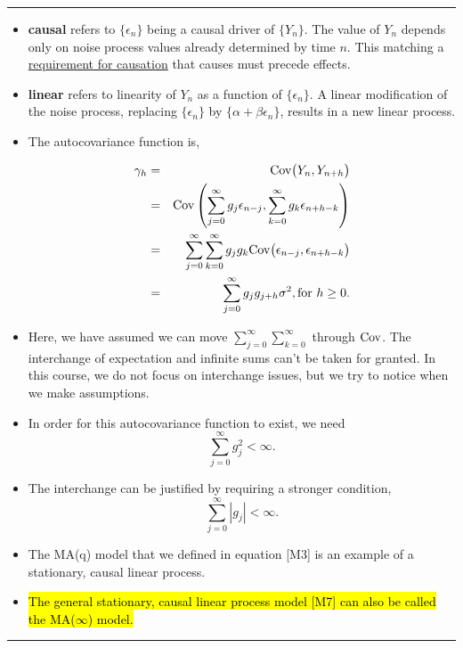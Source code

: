 \documentclass[]{article}
\begin{document}
\begin{center}\rule{0.5\linewidth}{\linethickness}\end{center}

\begin{itemize}
\item
  \textbf{causal} refers to \(\{\epsilon_n\}\) being a causal driver of
  \(\{Y_n\}\). The value of \(Y_n\) depends only on noise process values
  already determined by time \(n\). This matching a
  \href{https://en.wikipedia.org/wiki/Bradford_Hill_criteria}{requirement
  for causation} that causes must precede effects.
\item
  \textbf{linear} refers to linearity of \(Y_n\) as a function of
  \(\{\epsilon_n\}\). A linear modification of the noise process,
  replacing \(\{\epsilon_n\}\) by \(\{\alpha + \beta\epsilon_n\}\),
  results in a new linear process.
\item
  The autocovariance function is,

  \begin{eqnarray}
  \gamma_h &=& \mathrm{Cov}\big(Y_n,Y_{n+h}\big)\\
  &=& \mathrm{Cov}\left(\sum_{j=0}^\infty g_j\epsilon_{n-j},\sum_{k=0}^\infty g_k\epsilon_{n+h-k}\right)\\
  &=& \sum_{j=0}^\infty \sum_{k=0}^\infty  g_j g_k\mathrm{Cov}\big(\epsilon_{n-j},\epsilon_{n+h-k}\big)\\
  &=& \sum_{j=0}^\infty g_jg_{j+h} \sigma^2, \mbox{for $h\ge 0$}.
  \end{eqnarray}
\item
  Here, we have assumed we can move
  \(\sum_{j=0}^\infty \sum_{k=0}^\infty\) through \(\mathrm{Cov}\). The
  interchange of expectation and infinite sums can't be taken for
  granted. In this course, we do not focus on interchange issues, but we
  try to notice when we make assumptions.
\item
  In order for this autocovariance function to exist, we need
  \[\sum_{j=0}^\infty g_j^2 < \infty.\]
\item
  The interchange can be justified by requiring a stronger condition,
  \[\sum_{j=0}^\infty |g_j| < \infty.\]
\item
  The MA(q) model that we defined in equation {[}M3{]} is an example of
  a stationary, causal linear process.
\item
  \hl{The general stationary, causal linear process model {[}M7{]} can also
  be called the MA($\infty$) model.}
\end{itemize}

\begin{center}\rule{0.5\linewidth}{\linethickness}\end{center}
\end{document}
